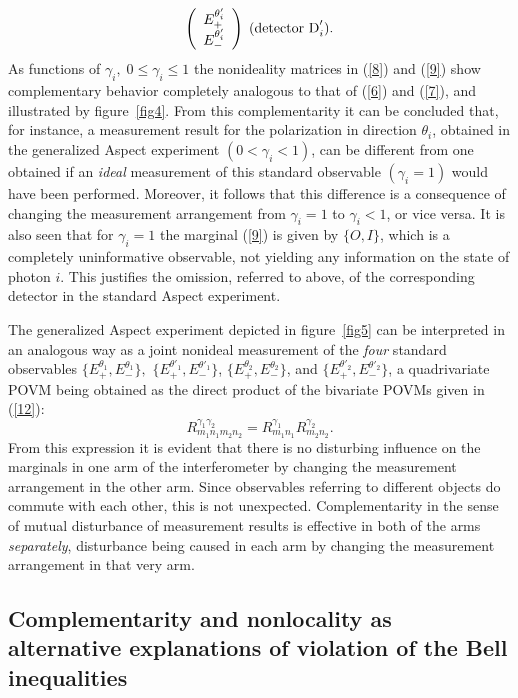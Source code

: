\documentclass{ws-procs975x65}
\begin{document}
{\begin{equation}
\left( \begin{array}{c} {E}^{\theta'_i}_{+} \\ {E}^{\theta'_i}_{-}
\end{array} \right)\;\mbox{\rm (detector D}'_i).\end{equation}
As functions of $\gamma_i,\; 0\leq \gamma_i \leq 1$ the
nonideality matrices in (\ref{8}) and (\ref{9}) show complementary
behavior completely analogous to that of (\ref{6}) and (\ref{7}),
and illustrated by figure~\ref{fig4}. From this complementarity it
can be concluded that, for instance, a measurement result for the
polarization in direction $\theta_i$, obtained in the generalized
Aspect experiment $(0<\gamma_i<1)$, can be different from one
obtained if an \textit{ideal} measurement of this standard
observable $(\gamma_i =1)$ would have been performed. Moreover, it
follows that this difference is a consequence of changing the
measurement arrangement from $\gamma_i=1$ to $\gamma_i <1$, or
vice versa. It is also seen that for $\gamma_i=1$ the marginal
(\ref{9}) is given by $\{O,I\}$, which is a completely
uninformative observable, not yielding any information on the
state of photon $i$. This justifies the omission, referred to
above, of the corresponding detector in the standard Aspect
experiment.

The generalized Aspect experiment depicted in figure~\ref{fig5}
can be interpreted in an analogous way as a joint nonideal
measurement of the \textit{four} standard observables
$\{{E}^{\theta_1}_+,{E}^{\theta_1}_-\},$
$\{{E}^{\theta'_1}_+,{E}^{\theta'_1}_-\}$,
$\{{E}^{\theta_2}_+,{E}^{\theta_2}_-\}$, and
$\{{E}^{\theta'_2}_+,{E}^{\theta'_2}_-\}$, a quadrivariate POVM
being obtained as the direct product of the bivariate POVMs given
in (\ref{12}):
\begin{equation}\label{3.1}{R}^{\gamma_1\gamma_2}_{m_{\!1}n_{\!1}m_2 n_2} =
R^{\gamma_1}_{m_{\!1} n_{\!1}}
 R^{\gamma_2}_{m_2 n_2}.
\end{equation}
From this expression it is evident that there is no disturbing
influence on the marginals in one arm of the interferometer by
changing the measurement arrangement in the other arm. Since
observables referring to different objects do commute with each
other, this is not unexpected. Complementarity in the sense of
mutual disturbance of measurement results is effective in both of
the arms \textit{separately}, disturbance being caused in each arm
by changing the measurement arrangement in that very arm.


\subsection{Complementarity and nonlocality as alternative explanations
of violation of the Bell inequalities}\label{sec3.2}

}
\end{document}
